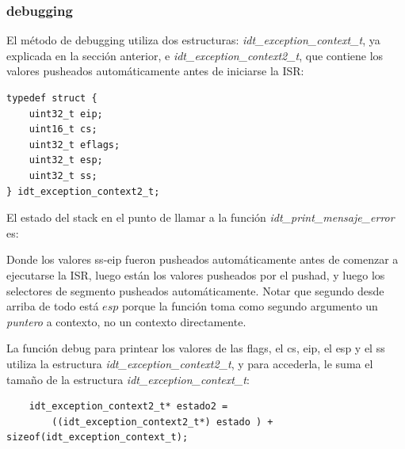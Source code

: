 \documentclass[a4paper]{article}
\newenvironment{codesnippet}{%
	\begin{Sbox}\begin{minipage}{\textwidth}\sffamily\small}%
	{\end{minipage}\end{Sbox}%
		\begin{center}%
		\vspace{-0.4cm}\colorbox{litegrey}{\TheSbox}\end{center}\vspace{0.3cm}}
\begin{document}
\subsubsection{debugging}

El método de debugging utiliza dos estructuras: \textit{idt_exception_context_t}, ya explicada en la sección anterior, e
\textit{idt_exception_context2_t}, que contiene los valores pusheados automáticamente antes de iniciarse la ISR:

\begin{codesnippet}
  \begin{verbatim}
typedef struct {
    uint32_t eip;
    uint16_t cs;
    uint32_t eflags;
    uint32_t esp;
    uint32_t ss;
} idt_exception_context2_t;
     \end{verbatim}
\end{codesnippet}


El estado del stack en el punto de llamar a la función \textit{idt_print_mensaje_error} es:

 \begin{center}
\end{center}

Donde los valores ss-eip fueron pusheados automáticamente antes  de comenzar a ejecutarse la ISR, luego están los
valores pusheados por el pushad, y luego los selectores de segmento pusheados automáticamente. Notar que segundo desde
arriba de todo está $esp$ porque la función toma como segundo argumento un \textit{puntero} a contexto, no un contexto
directamente.

La función debug para printear los valores de las flags, el cs, eip, el esp y el ss utiliza la estructura
\textit{idt_exception_context2_t}, y para accederla, le suma el tamaño de la estructura
\textit{idt_exception_context_t}:

\begin{codesnippet}
  \begin{verbatim}
    idt_exception_context2_t* estado2 =
        ((idt_exception_context2_t*) estado ) + sizeof(idt_exception_context_t);
     \end{verbatim}
\end{codesnippet}
\end{document}

